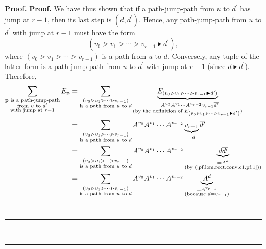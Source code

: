 \documentclass[numbers=enddot,12pt,final,onecolumn,notitlepage]{scrartcl}%
\theoremstyle{definition}
\newenvironment{vershort}{}{}
\newcommand{\downslack}{A}
\newenvironment{proof}[1][Proof]{\noindent\textbf{#1.} }{\ \rule{0.5em}{0.5em}}
\let\sumnonlimits\sum
\renewcommand{\sum}{\sumnonlimits\limits}
\begin{document}
\begin{proof}
\begin{proof}
\begin{vershort}
We have thus shown that if a path-jump-path from $u$ to $d^{\prime}$ has jump
at $r-1$, then its last step is $\left(  d,d^{\prime}\right)  $. Hence, any
path-jump-path from $u$ to $d^{\prime}$ with jump at $r-1$ must have the form%
\[
\left(  v_{0}\gtrdot v_{1}\gtrdot\cdots\gtrdot v_{r-1}\blacktriangleright
d^{\prime}\right)  ,
\]
where $\left(  v_{0}\gtrdot v_{1}\gtrdot\cdots\gtrdot v_{r-1}\right)  $ is a
path from $u$ to $d$. Conversely, any tuple of the latter form is a
path-jump-path from $u$ to $d^{\prime}$ with jump at $r-1$ (since
$d\blacktriangleright d^{\prime}$). Therefore,%
\begin{align*}
\sum_{\substack{\mathbf{p}\text{ is a path-jump-path}\\\text{from }u\text{ to
}d^{\prime}\\\text{with jump at }r-1}}E_{\mathbf{p}}  &  =\sum
_{\substack{\left(  v_{0}\gtrdot v_{1}\gtrdot\cdots\gtrdot v_{r-1}\right)
\\\text{is a path from }u\text{ to }d}}\underbrace{E_{\left(  v_{0}\gtrdot
v_{1}\gtrdot\cdots\gtrdot v_{r-1}\blacktriangleright d^{\prime}\right)  }%
}_{\substack{=\downslack^{v_{0}}\downslack^{v_{1}}\cdots\downslack^{v_{r-2}%
}v_{r-1}\overline{d^{\prime}}\\\text{(by the definition of }E_{\left(
v_{0}\gtrdot v_{1}\gtrdot\cdots\gtrdot v_{r-1}\blacktriangleright d^{\prime
}\right)  }\text{)}}}\\
&  =\sum_{\substack{\left(  v_{0}\gtrdot v_{1}\gtrdot\cdots\gtrdot
v_{r-1}\right)  \\\text{is a path from }u\text{ to }d}}\downslack^{v_{0}%
}\downslack^{v_{1}}\cdots\downslack^{v_{r-2}}\underbrace{v_{r-1}%
}_{\substack{=d}}\overline{d^{\prime}}\\
&  =\sum_{\substack{\left(  v_{0}\gtrdot v_{1}\gtrdot\cdots\gtrdot
v_{r-1}\right)  \\\text{is a path from }u\text{ to }d}}\downslack^{v_{0}%
}\downslack^{v_{1}}\cdots\downslack^{v_{r-2}}\underbrace{d\overline{d^{\prime
}}}_{\substack{=\downslack^{d}\\\text{(by (\ref{pf.lem.rect.conv.c1.pf.1}))}%
}}\\
&  =\sum_{\substack{\left(  v_{0}\gtrdot v_{1}\gtrdot\cdots\gtrdot
v_{r-1}\right)  \\\text{is a path from }u\text{ to }d}}\downslack^{v_{0}%
}\downslack^{v_{1}}\cdots\downslack^{v_{r-2}}\underbrace{\downslack^{d}%
}_{\substack{=\downslack^{v_{r-1}}\\\text{(because }d=v_{r-1}\text{)}}}\\

\end{align*}
\end{vershort}
\end{proof}
\end{proof}
\end{document}
